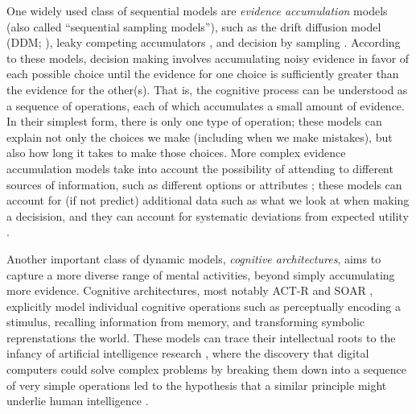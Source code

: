 One widely used class of sequential models are \emph{evidence accumulation} models (also called ``sequential sampling models''), such as the drift diffusion model (DDM; \citealp{ratcliff1978theory}), leaky competing accumulators \citep{usher2001time}, and decision by sampling \citep{stewart2006decision}. According to these models, decision making involves accumulating noisy evidence in favor of each possible choice until the evidence for one choice is sufficiently greater than the evidence for the other(s). That is, the cognitive process can be understood as a sequence of operations, each of which accumulates a small amount of evidence. In their simplest form, there is only one type of operation; these models can explain not only the choices we make (including when we make mistakes), but also how long it takes to make those choices. More complex evidence accumulation models take into account the possibility of attending to different sources of information, such as different options \citep{krajbich2010visual} or attributes \citep{russo1983strategies}; these models can account for (if not predict) additional data such as what we look at when making a decisision, and they can account for systematic deviations from expected utility \citep{busemeyer2019cognitive}.

Another important class of dynamic models, \emph{cognitive architectures}, aims to capture a more diverse range of mental activities, beyond simply accumulating more evidence. Cognitive architectures, most notably ACT-R \citep{anderson1996act} and SOAR \citep{laird1987soar}, explicitly model individual cognitive operations such as perceptually encoding a stimulus, recalling information from memory, and transforming symbolic reprenstations the world. These models can trace their intellectual roots to the infancy of artificial intelligence research \citep{newell1956logic}, where the discovery that digital computers could solve complex problems by breaking them down into a sequence of very simple operations led to the hypothesis that a similar principle might underlie human intelligence \citep{newell1958elements,newell1972human}. 

